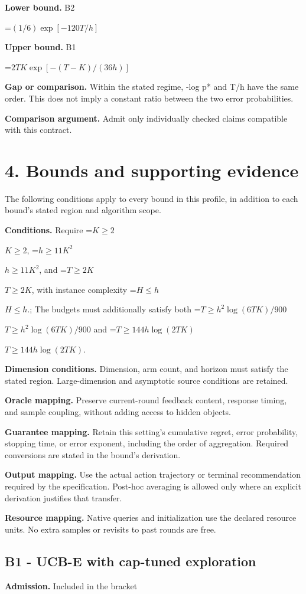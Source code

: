\documentclass[10pt,a4paper]{article}
\newcommand{\AtlasMath}[1]{\par\begingroup\centering\setbox0=\hbox{$\displaystyle #1$}\ifdim\wd0>1.4\linewidth\typeout{ATLAS WIDE FORMULA: \the\wd0}\fi\ifdim\wd0>\linewidth\resizebox{\linewidth}{!}{\box0}\else\box0\fi\par\endgroup}
\newcommand{\AtlasInlineMath}[1]{\begingroup\setbox0=\hbox{$#1$}\ifdim\wd0>.4\linewidth\endgroup\AtlasMath{#1}\else\endgroup$#1$\fi}
\begin{document}
\textbf{Lower bound.} B2

\AtlasMath{(1/6) \exp[-120T/h]}
\textbf{Upper bound.} B1

\AtlasMath{2TK \exp[-(T-K)/(36h)]}
\textbf{Gap or comparison.} Within the stated regime, -log p* and T/h have the same order. This does not imply a constant ratio between the two error probabilities.

\textbf{Comparison argument.} Admit only individually checked claims compatible with this contract.

\section{4. Bounds and supporting evidence}
The following conditions apply to every bound in this profile, in addition to each bound's stated region and algorithm scope.

\textbf{Conditions.} Require \AtlasInlineMath{K\ge2}, \AtlasInlineMath{h\ge11K^2}, and \AtlasInlineMath{T\ge2K}, with instance complexity \AtlasInlineMath{H\le h}.; The budgets must additionally satisfy both \AtlasInlineMath{T\ge h^2\log(6TK)/900} and \AtlasInlineMath{T\ge144h\log(2TK)}.

\textbf{Dimension conditions.} Dimension, arm count, and horizon must satisfy the stated region. Large-dimension and asymptotic source conditions are retained.

\textbf{Oracle mapping.} Preserve current-round feedback content, response timing, and sample coupling, without adding access to hidden objects.

\textbf{Guarantee mapping.} Retain this setting's cumulative regret, error probability, stopping time, or error exponent, including the order of aggregation. Required conversions are stated in the bound's derivation.

\textbf{Output mapping.} Use the actual action trajectory or terminal recommendation required by the specification. Post-hoc averaging is allowed only where an explicit derivation justifies that transfer.

\textbf{Resource mapping.} Native queries and initialization use the declared resource units. No extra samples or revisits to past rounds are free.

\subsection{B1 - UCB-E with cap-tuned exploration}
\textbf{Admission.} Included in the bracket
\end{document}
